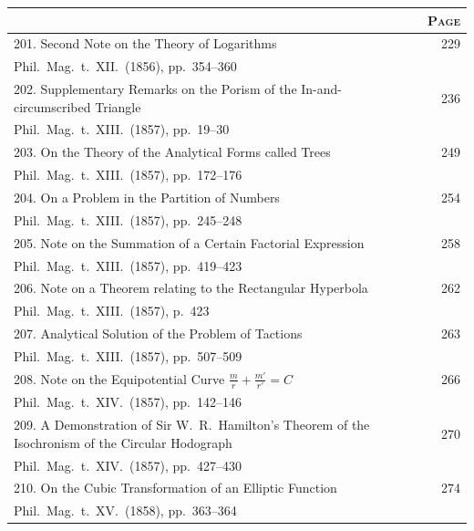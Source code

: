 \documentclass[11pt,a4paper]{book}
\begin{document}
\clearpage

\begin{longtable}{p{}r}
\toprule
\multicolumn{1}{c}{} & \multicolumn{1}{c}{\textsc{Page}} \\
\midrule
\endhead
201. Second Note on the Theory of Logarithms \dotfill & 229 \\
\multicolumn{2}{l}{\small Phil.\ Mag.\ t.~XII.\ (1856), pp.~354--360} \\[0.5em]
%
202. Supplementary Remarks on the Porism of the In-and-circumscribed Triangle \dotfill & 236 \\
\multicolumn{2}{l}{\small Phil.\ Mag.\ t.~XIII.\ (1857), pp.~19--30} \\[0.5em]
%
203. On the Theory of the Analytical Forms called Trees \dotfill & 249 \\
\multicolumn{2}{l}{\small Phil.\ Mag.\ t.~XIII.\ (1857), pp.~172--176} \\[0.5em]
%
204. On a Problem in the Partition of Numbers \dotfill & 254 \\
\multicolumn{2}{l}{\small Phil.\ Mag.\ t.~XIII.\ (1857), pp.~245--248} \\[0.5em]
%
205. Note on the Summation of a Certain Factorial Expression \dotfill & 258 \\
\multicolumn{2}{l}{\small Phil.\ Mag.\ t.~XIII.\ (1857), pp.~419--423} \\[0.5em]
%
206. Note on a Theorem relating to the Rectangular Hyperbola \dotfill & 262 \\
\multicolumn{2}{l}{\small Phil.\ Mag.\ t.~XIII.\ (1857), p.~423} \\[0.5em]
%
207. Analytical Solution of the Problem of Tactions \dotfill & 263 \\
\multicolumn{2}{l}{\small Phil.\ Mag.\ t.~XIII.\ (1857), pp.~507--509} \\[0.5em]
%
208. Note on the Equipotential Curve $\frac{m}{r}+\frac{m'}{r'}=C$ \dotfill & 266 \\
\multicolumn{2}{l}{\small Phil.\ Mag.\ t.~XIV.\ (1857), pp.~142--146} \\[0.5em]
%
209. A Demonstration of Sir W.~R.\ Hamilton's Theorem of the Isochronism of the Circular Hodograph \dotfill & 270 \\
\multicolumn{2}{l}{\small Phil.\ Mag.\ t.~XIV.\ (1857), pp.~427--430} \\[0.5em]
%
210. On the Cubic Transformation of an Elliptic Function \dotfill & 274 \\
\multicolumn{2}{l}{\small Phil.\ Mag.\ t.~XV.\ (1858), pp.~363--364} \\[0.5em]

\end{longtable}
\end{document}
